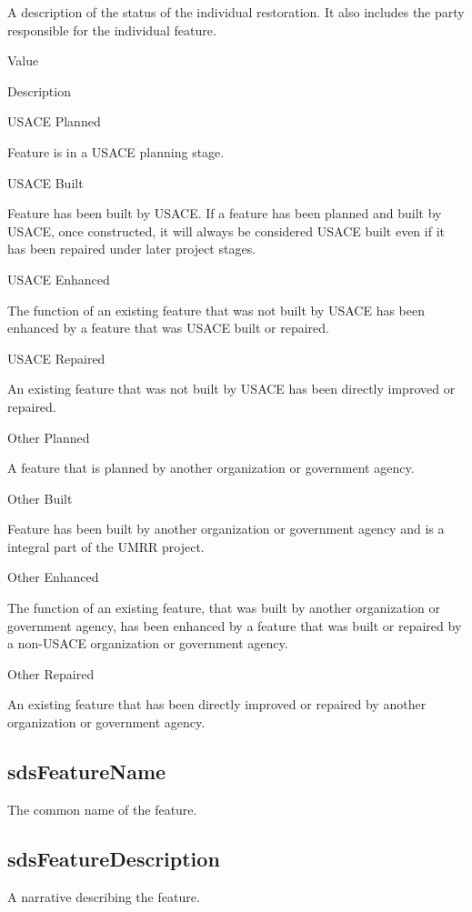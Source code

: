 \documentclass[
  letterpaper,
  DIV=11,
  numbers=noendperiod]{scrreprt}
\begin{document}
A description of the status of the individual restoration. It also
includes the party responsible for the individual feature.

Value

Description

USACE Planned

Feature is in a USACE planning stage.

USACE Built

Feature has been built by USACE. If a feature has been planned and built
by USACE, once constructed, it will always be considered USACE built
even if it has been repaired under later project stages.

USACE Enhanced

The function of an existing feature that was not built by USACE has been
enhanced by a feature that was USACE built or repaired.

USACE Repaired

An existing feature that was not built by USACE has been directly
improved or repaired.

Other Planned

A feature that is planned by another organization or government agency.

Other Built

Feature has been built by another organization or government agency and
is a integral part of the UMRR project.

Other Enhanced

The function of an existing feature, that was built by another
organization or government agency, has been enhanced by a feature that
was built or repaired by a non-USACE organization or government agency.

Other Repaired

An existing feature that has been directly improved or repaired by
another organization or government agency.

\subsection{sdsFeatureName}\label{sdsfeaturename-6}

The common name of the feature.

\subsection{sdsFeatureDescription}\label{sdsfeaturedescription-6}

A narrative describing the feature.
\end{document}
